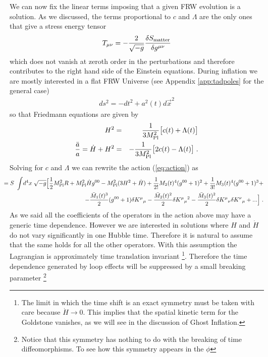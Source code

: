 \documentclass[12pt,letterpaper]{article}
\def\be{\begin{eqnarray}}
\def\ee{\end{eqnarray}}
\begin{document}
{We can now fix the linear terms imposing that a given FRW evolution is
a solution. As we discussed, the terms proportional to $c$ and $\Lambda$ are the only
ones that give a stress energy tensor
\begin{equation}
T_{\mu \nu} = -\frac{2}{\sqrt{-g}}\frac{\delta S_{\rm
matter}}{\delta g^{\mu\nu}}
\end{equation}
which does not vanish at
zeroth order in the perturbations and therefore contributes to the
right hand side of the Einstein equations. During inflation we are mostly interested in a flat FRW Universe (see Appendix \ref{app:tadpoles} for the general case) 
\be
ds^2 = -dt^2 + a^2(t) d \vec{x}^2 
\ee
so that Friedmann equations are given by
\begin{eqnarray}
H^2 & = & \frac{1}{3 M_{\rm Pl}^2} \big[ c(t)+\Lambda(t)\big]  \\
\frac{\ddot a}{a} = \dot H + H^2 & =  & -\frac{1}{3 M_{\rm Pl}^2} \big[ 2
c(t)-\Lambda(t) \big] \;.
\end{eqnarray}
Solving for $c$ and $\Lambda$ we can rewrite the action (\ref{eq:action}) as
\begin{eqnarray}
\label{eq:actiontad}\nonumber
S & \!\!\!\!\!\!\!\!\!\!\!\!= \!\!\!\!\!\!\!\!\!& \!\!\!\int  \! d^4 x \; \sqrt{- g} \Big[ \frac12 M_{\rm Pl}^2 R + M_{\rm Pl}^2 \dot H
g^{00} - M_{\rm Pl}^2 (3 H^2 + \dot H) + \frac{1}{2!}M_2(t)^4(g^{00}+1)^2+\frac{1}{3!}M_3(t)^4 (g^{00}+1)^3+ \\
&& - \frac{\bar M_1(t)^3}{2} (g^{00}+1)\delta K^\mu {}_\mu
-\frac{\bar M_2(t)^2}{2} \delta K^\mu {}_\mu {}^2
-\frac{\bar M_3(t)^2}{2} \delta K^\mu {}_\nu \delta K^\nu {}_\mu + ...
\Big] \; .
\end{eqnarray}
As we said all the coefficients of the operators in the action above
may have a generic time dependence. However we are interested in
solutions where $H$ and $\dot H$ do not vary significantly in one
Hubble time.  Therefore it is natural to assume that the same holds
for all the other operators. With this assumption the Lagrangian is
approximately time translation invariant \footnote{The limit in which
  the time shift is an exact symmetry must be taken with care because
  $\dot H \to 0$. This implies that the spatial kinetic term for the
  Goldstone vanishes, as we will see in the discussion of Ghost
  Inflation.}. Therefore the time dependence generated by loop effects
will be suppressed by a small breaking parameter \footnote{Notice that
  this symmetry has nothing to do with the breaking of time
  diffeomorphisms. To see how this symmetry appears in the $\phi$
}}
\end{document}
